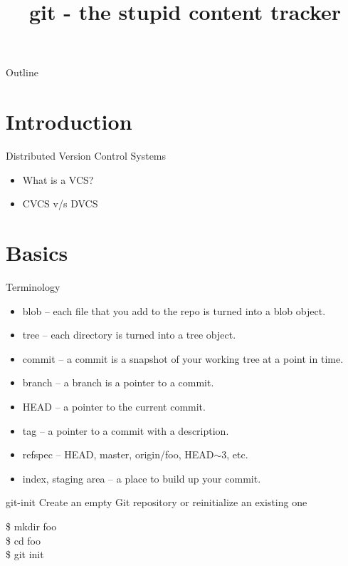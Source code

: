 \documentclass{beamer}
\title{git - the stupid content tracker}
\begin{document}
\begin{frame}
  \titlepage
\end{frame}

\begin{frame}{Outline}
  \tableofcontents
\end{frame}


\section{Introduction}

\begin{frame}{Distributed Version Control Systems}
  \begin{itemize}
  \item What is a VCS?
  \item CVCS v/s DVCS
  \end{itemize}
\end{frame}

\section{Basics}

\begin{frame}{Terminology}
  \begin{itemize}
  \item blob -- each file that you add to the repo is turned into a blob object.
  \item tree -- each directory is turned into a tree object.
  \item commit -- a commit is a snapshot of your working tree at a point in time.
  \item branch -- a branch is a pointer to a commit.
  \item HEAD -- a pointer to the current commit.
  \item tag -- a pointer to a commit with a description.
  \item refspec -- HEAD, master, origin/foo, HEAD$\sim$3, etc.
  \item index, staging area -- a place to build up your commit.
  \end{itemize}
\end{frame}

\begin{frame}{git-init}
  Create an empty Git repository or reinitialize an existing one
  \begin{Example}
    \$ mkdir foo \\
    \$ cd foo \\
    \$ git init
  \end{Example}
\end{frame}
\end{document}
